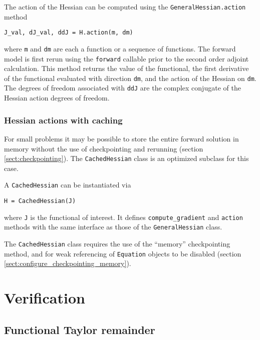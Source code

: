 \documentclass[11pt]{article}
\begin{document}
The action of the Hessian can be computed using the
\texttt{GeneralHessian.action} method
\begin{lstlisting}
J_val, dJ_val, ddJ = H.action(m, dm)
\end{lstlisting}
where \texttt{m} and \texttt{dm} are each a function or a sequence of
functions. The forward model is first rerun using the \texttt{forward} callable
prior to the second order adjoint calculation. This method returns the value of
the functional, the first derivative of the functional evaluated with direction
\texttt{dm}, and the action of the Hessian on \texttt{dm}. The degrees of
freedom associated with \texttt{ddJ} are the complex conjugate of the Hessian
action degrees of freedom.

\subsubsection{Hessian actions with caching}

For small problems it may be possible to store the entire forward solution in
memory without the use of checkpointing and rerunning (section
\ref{sect:checkpointing}). The \texttt{CachedHessian} class is an optimized
subclass for this case.

A \texttt{CachedHessian} can be instantiated via
\begin{lstlisting}
H = CachedHessian(J)
\end{lstlisting}
where \texttt{J} is the functional of interest. It defines
\texttt{compute\_gradient} and \texttt{action} methods with the same interface
as those of the \texttt{GeneralHessian} class.

The \texttt{CachedHessian} class requires the use of the ``memory''
checkpointing method, and for weak referencing of \texttt{Equation} objects to
be disabled (section \ref{sect:configure_checkpointing_memory}).

\section{Verification}\label{sect:verification}

\subsection{Functional Taylor remainder}
\end{document}
